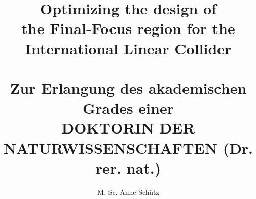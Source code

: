 \documentclass[english,final]{sdqthesis}
\author{M. Sc. Anne Sch\"utz}
\title{\LARGE Optimizing the design of\\the Final-Focus region for the\\International Linear Collider\\
\hfill
\\ \large Zur Erlangung des akademischen Grades einer\\
DOKTORIN DER NATURWISSENSCHAFTEN (Dr. rer. nat.)}
\begin{document}
\setpdf

\maketitle
	
\frontmatter


\end{document}
